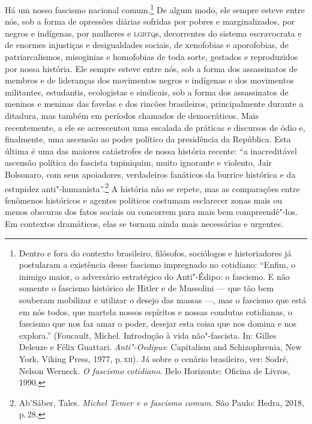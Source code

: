 Há um nosso fascismo nacional comum.\footnote{Dentro e fora do contexto
  brasileiro, filósofos, sociólogos e historiadores já postularam a
  existência desse fascismo impregnado no cotidiano: ``Enfim, o inimigo
  maior, o adversário estratégico do Anti"-Édipo: o fascismo. E não
  somente o fascismo histórico de Hitler e de Mussolini --- que tão bem
  souberam mobilizar e utilizar o desejo das massas ---, mas o fascismo
  que está em nós todos, que martela nossos espíritos e nossas condutas
  cotidianas, o fascismo que nos faz amar o poder, desejar esta coisa
  que nos domina e nos explora.'' (Foucault, Michel. Introdução à vida
  não"-fascista. In: Gilles Deleuze e Félix Guattari.
  \emph{Anti"-Oedipus}: Capitalism and Schizophrenia, New York, Viking
  Press, 1977, p.\,\textsc{xii}). Já sobre o cenário brasileiro, ver: Sodré,
  Nelson Werneck. \emph{O fascismo cotidiano}. Belo Horizonte: Oficina
  de Livros, 1990.} De algum modo, ele sempre esteve entre nós, sob a
forma de opressões diárias sofridas por pobres e marginalizados, por
negros e indígenas, por mulheres e \textsc{lgbtq}s, decorrentes do sistema
escravocrata e de enormes injustiças e desigualdades sociais, de
xenofobias e aporofobias, de patriarcalismos, misoginias e homofobias de
toda sorte, gestados e reproduzidos por nossa história. Ele sempre
esteve entre nós, sob a forma dos assassinatos de membros e de
lideranças dos movimentos negros e indígenas e dos movimentos
militantes, estudantis, ecologistas e sindicais, sob a forma dos
assassinatos de meninos e meninas das favelas e dos rincões brasileiros,
principalmente durante a ditadura, mas também em períodos chamados de
democráticos. Mais recentemente, a ele se acrescentou uma escalada de
práticas e discursos de ódio e, finalmente, uma ascensão ao poder
político da presidência da República. Esta última é uma das maiores
catástrofes de nossa história recente: ``a inacreditável ascensão
política do fascista tupiniquim, muito ignorante e violento, Jair
Bolsonaro, com seus apoiadores, verdadeiros fanáticos da burrice
histórica e da estupidez anti"-humanista''.\footnote{Ab'Sáber, Tales.
  \emph{Michel Temer e o fascismo comum}. São Paulo: Hedra, 2018, p.\,28.}
A história não se repete, mas as comparações entre fenômenos históricos
e agentes políticos costumam esclarecer zonas mais ou menos obscuras dos
fatos sociais ou concorrem para mais bem compreendê"-los. Em contextos
dramáticos, elas se tornam ainda mais necessárias e urgentes.


